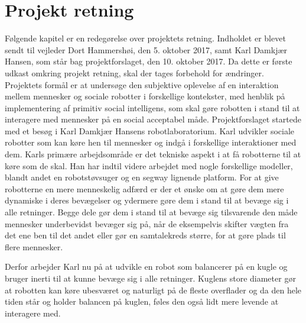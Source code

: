 \chapter{Projekt retning}
\label{ProjektRetning}
%
Følgende kapitel er en redegørelse over projektets retning. Indholdet er blevet sendt til vejleder Dort Hammershøi, den 5. oktober 2017, samt Karl Damkjær Hansen, som står bag projektforslaget, den 10. oktober 2017. Da dette er første udkast omkring projekt retning, skal der tages forbehold for ændringer.\blankline
%
Projektets formål er at undersøge den subjektive oplevelse af en interaktion mellem mennesker og sociale robotter i forskellige kontekster, med henblik på implementering af primitiv social intelligens, som skal gøre robotten i stand til at interagere med mennesker på en social acceptabel måde.\blankline
%
Projektforslaget startede med et besøg i Karl Damkjær Hansens robotlaboratorium. Karl udvikler sociale robotter som kan køre hen til mennesker og indgå i forskellige interaktioner med dem. Karls primære arbejdsområde er det tekniske aspekt i at få robotterne til at køre som de skal. Han har indtil videre arbejdet med nogle forskellige modeller, blandt andet en robotstøvsuger og en segway lignende platform. For at give robotterne en mere menneskelig adfærd er der et ønske om at gøre dem mere dynamiske i deres bevægelser og ydermere gøre dem i stand til at bevæge sig i alle retninger. Begge dele gør dem i stand til at bevæge sig tilsvarende den måde mennesker underbevidst bevæger sig på, når de eksempelvis skifter vægten fra det ene ben til det andet eller gør en samtalekreds større, for at gøre plads til flere mennesker. 

Derfor arbejder Karl nu på at udvikle en robot som balancerer på en kugle og bruger inerti til at kunne bevæge sig i alle retninger. Kuglens store diameter gør at robotten kan køre ubesværet og naturligt på de fleste overflader og da den hele tiden står og holder balancen på kuglen, føles den også lidt mere levende at interagere med.
%
